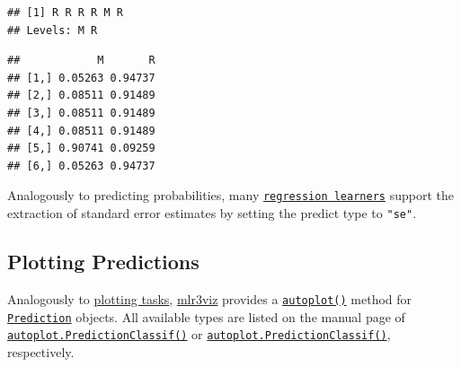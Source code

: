 \documentclass[]{scrbook}
\newenvironment{Shaded}{\begin{snugshade}}{\end{snugshade}}
\newcommand{\CommentTok}[1]{\textcolor[rgb]{0.56,0.35,0.01}{\textit{#1}}}
\newcommand{\KeywordTok}[1]{\textcolor[rgb]{0.13,0.29,0.53}{\textbf{#1}}}
\newcommand{\NormalTok}[1]{#1}
\newcommand{\OperatorTok}[1]{\textcolor[rgb]{0.81,0.36,0.00}{\textbf{#1}}}
\renewenvironment{Shaded} {\begin{snugshade}\small} {\end{snugshade}}
\begin{document}
\begin{Shaded}
\end{Shaded}

\begin{verbatim}
## [1] R R R R M R
## Levels: M R
\end{verbatim}

\begin{Shaded}
\end{Shaded}

\begin{verbatim}
##            M       R
## [1,] 0.05263 0.94737
## [2,] 0.08511 0.91489
## [3,] 0.08511 0.91489
## [4,] 0.08511 0.91489
## [5,] 0.90741 0.09259
## [6,] 0.05263 0.94737
\end{verbatim}

Analogously to predicting probabilities, many \href{https://mlr3.mlr-org.com/reference/LearnerRegr.html}{\texttt{regression\ learners}} support the extraction of standard error estimates by setting the predict type to \texttt{"se"}.

\hypertarget{autoplot-prediction}{%
\subsection{Plotting Predictions}\label{autoplot-prediction}}

Analogously to \protect\hyperlink{autoplot-task}{plotting tasks}, \href{https://mlr3viz.mlr-org.com}{mlr3viz} provides a \href{https://www.rdocumentation.org/packages/ggplot2/topics/autoplot}{\texttt{autoplot()}} method for \href{https://mlr3.mlr-org.com/reference/Prediction.html}{\texttt{Prediction}} objects.
All available types are listed on the manual page of \href{https://mlr3viz.mlr-org.com/reference/autoplot.PredictionClassif.html}{\texttt{autoplot.PredictionClassif()}} or \href{https://mlr3viz.mlr-org.com/reference/autoplot.PredictionClassif.html}{\texttt{autoplot.PredictionClassif()}}, respectively.
\end{document}
